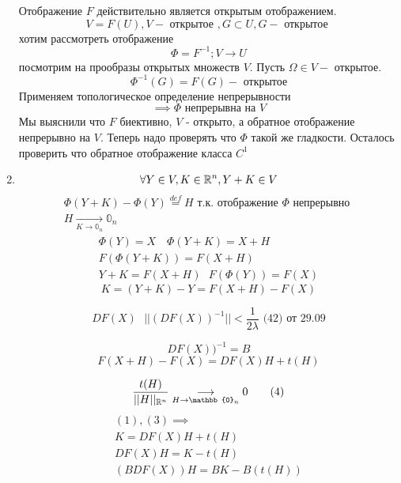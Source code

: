 \documentclass[main]{subfiles}
\begin{document}
\begin{longProof}
\begin{enumerate}
                 Отображение $F$ действительно является открытым отображением.
                 \[ V =F(U), V - \text{ открытое } , G \subset U, G - \text{ открытое }\]
                 хотим рассмотреть отображение
                 \[ \Phi = F^{-1}; V \rightarrow U \]
                 посмотрим на прообразы открытых множеств $V$.
                 Пусть $\Omega \in V - $ открытое.
                 \[ \Phi^{-1}(G) = F(G) - \text{ открытое}\]
                 Применяем топологическое определение непрерывности
                 \[ \implies \Phi \text{ непрерывна на } V \]
                 Мы выяснили что $F$ биективно, $V$ - открыто, а обратное отображение непрерывно
                   на $V$. Теперь надо проверять что $\Phi$ такой же гладкости.
                   Осталось проверить что обратное отображение класса $C^1$
                  \item \[\forall Y \in V , K \in {\mathbb{R}}^n , Y + K \in V\] 
                  \begin{gather*}
                  \Phi(Y+K) - \Phi(Y) \stackrel{def}{=} H \text { т.к. отображение } \Phi
                 \text { непрерывно }\\
                  H \underset{K \to \mathbb{0}_n}{\longrightarrow} \mathbb{0}_n 
                  \end{gather*}
                 \begin{gather*}
                     \Phi(Y) = X \quad \Phi(Y+K) = X + H \\
                      F(\Phi(Y+K)) = F(X+H) \\
                     Y + K = F(X+H) \text{  } F(\Phi(Y)) = F(X) 
                 \end{gather*}
                 \[   K = (Y+K) - Y = F(X+H) - F(X) \tag{1} \]
 
                 \[DF(X) \text {   } ||(DF(X))^{-1}|| < \frac{1}{2\lambda} \text{ (42) от 29.09} \tag{2} \]
 
                 \[DF(X))^{-1} = B \]
                 \[F(X+H) - F(X) = DF(X)H+ t(H) \tag{3}\]
 
                 \[ \frac{t(H)}{||H||_{{\vR}^n}} \underset{H \to \mathbb{0}_n}{\longrightarrow} 0 \tag{4} \]
                  \begin{gather*}
                     (1),(3) \implies \\
                     K = DF(X)H + t(H) \\
                     DF(X)H = K - t(H) \\
                     (BDF(X))H = BK - B(t(H))
                  \end{gather*}
 

\end{enumerate}
\end{longProof}
\end{document}
